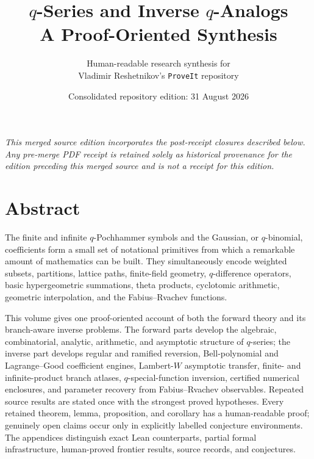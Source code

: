 \documentclass[11pt,a4paper,oneside,openany]{book}
\title{\Huge\bfseries $q$-Series and Inverse $q$-Analogs\\[8pt]
\Large A Proof-Oriented Synthesis}
\author{Human-readable research synthesis for\\
\small Vladimir Reshetnikov's \texttt{ProveIt} repository}
\date{Consolidated repository edition: 31 August 2026}
\theoremstyle{definition}
\theoremstyle{remark}
\begin{document}
\frontmatter
\hypersetup{pageanchor=false}
\maketitle
\hypersetup{pageanchor=true}

\begin{center}
\small\itshape This merged source edition incorporates the post-receipt
closures described below.  Any pre-merge PDF receipt is retained solely as
historical provenance for the edition preceding this merged source and is not
a receipt for this edition.
\end{center}

\chapter*{Abstract}
The finite and infinite $q$-Pochhammer symbols and the Gaussian, or
$q$-binomial, coefficients form a small set of notational primitives from
which a remarkable amount of mathematics can be built.  They simultaneously
encode weighted subsets, partitions, lattice paths, finite-field geometry,
$q$-difference operators, basic hypergeometric summations, theta products,
cyclotomic arithmetic, geometric interpolation, and the Fabius--Rvachev
functions.

This volume gives one proof-oriented account of both the forward theory and
its branch-aware inverse problems.  The forward parts develop the algebraic,
combinatorial, analytic, arithmetic, and asymptotic structure of $q$-series;
the inverse part develops regular and ramified reversion, Bell-polynomial and
Lagrange--Good coefficient engines, Lambert-$W$ asymptotic transfer,
finite- and infinite-product branch atlases, $q$-special-function inversion,
certified numerical enclosures, and parameter recovery from Fabius--Rvachev
observables.  Repeated source results are stated once with the strongest
proved hypotheses.  Every retained theorem, lemma, proposition, and corollary
has a human-readable proof; genuinely open claims occur only in explicitly
labelled conjecture environments.  The appendices distinguish exact Lean
counterparts, partial formal infrastructure, human-proved frontier results,
source records, and conjectures.
\end{document}

